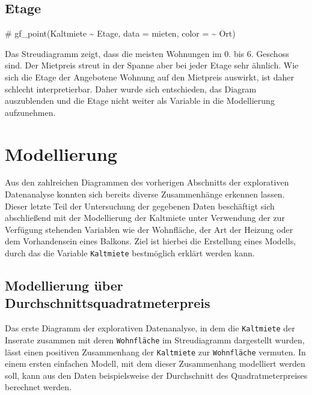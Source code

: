 \documentclass[
  a4paper,
  DIV=11]{scrartcl}
\newenvironment{Shaded}{\begin{snugshade}}{\end{snugshade}}
\newcommand{\CommentTok}[1]{\textcolor[rgb]{0.37,0.37,0.37}{#1}}
\begin{document}
\hypertarget{etage}{%
\subsection{Etage}\label{etage}}

\begin{Shaded}
\begin{Highlighting}[]
\CommentTok{\# gf\_point(Kaltmiete \textasciitilde{} Etage, data = mieten, color = \textasciitilde{} Ort)}
\end{Highlighting}
\end{Shaded}

Das Streudiagramm zeigt, dass die meisten Wohnungen im 0. bis 6.
Geschoss sind. Der Mietpreis streut in der Spanne aber bei jeder Etage
sehr ähnlich. Wie sich die Etage der Angebotene Wohnung auf den
Mietpreis auswirkt, ist daher schlecht interpretierbar. Daher wurde sich
entschieden, das Diagram auszublenden und die Etage nicht weiter als
Variable in die Modellierung aufzunehmen.

\hypertarget{modellierung}{%
\section{Modellierung}\label{modellierung}}

Aus den zahlreichen Diagrammen des vorherigen Abschnitts der
explorativen Datenanalyse konnten sich bereits diverse Zusammenhänge
erkennen lassen. Dieser letzte Teil der Untersuchung der gegebenen Daten
beschäftigt sich abschließend mit der Modellierung der Kaltmiete unter
Verwendung der zur Verfügung stehenden Variablen wie der Wohnfläche, der
Art der Heizung oder dem Vorhandensein eines Balkons. Ziel ist hierbei
die Erstellung eines Modells, durch das die Variable \texttt{Kaltmiete}
bestmöglich erklärt werden kann.

\hypertarget{modellierung-uxfcber-durchschnittsquadratmeterpreis}{%
\subsection{Modellierung über
Durchschnittsquadratmeterpreis}\label{modellierung-uxfcber-durchschnittsquadratmeterpreis}}

Das erste Diagramm der explorativen Datenanalyse, in dem die
\texttt{Kaltmiete} der Inserate zusammen mit deren \texttt{Wohnfläche}
im Streudiagramm dargestellt wurden, lässt einen positiven Zusammenhang
der \texttt{Kaltmiete} zur \texttt{Wohnfläche} vermuten. In einem ersten
einfachen Modell, mit dem dieser Zusammenhang modelliert werden soll,
kann aus den Daten beispielsweise der Durchschnitt des
Quadratmeterpreises berechnet werden.
\end{document}
